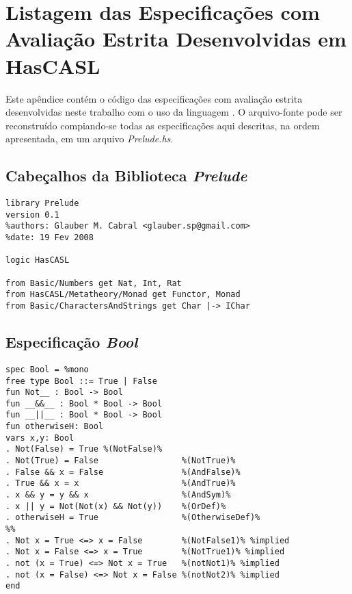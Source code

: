 \chapter{Listagem das Especificações com Avaliação Estrita Desenvolvidas em HasCASL}
\label{appendix:strictSpec}
Este apêndice contém o código das especificações com avaliação estrita desenvolvidas neste trabalho com o uso da linguagem \HasCASL.
O arquivo-fonte pode ser reconstruído compiando-se todas as especificações aqui descritas, na ordem apresentada, em um arquivo \textit{Prelude.hs}.

\section{Cabeçalhos da Biblioteca \textit{Prelude}}
\label{appendix:strictSpec:header}
\begin{Verbatim}
library Prelude
version 0.1
%authors: Glauber M. Cabral <glauber.sp@gmail.com>
%date: 19 Fev 2008

logic HasCASL 

from Basic/Numbers get Nat, Int, Rat
from HasCASL/Metatheory/Monad get Functor, Monad
from Basic/CharactersAndStrings get Char |-> IChar
\end{Verbatim}

\section{Especificação \textit{Bool}}
\label{appendix:strictSpec:bool}
\begin{Verbatim}
spec Bool = %mono
free type Bool ::= True | False 
fun Not__ : Bool -> Bool
fun __&&__ : Bool * Bool -> Bool
fun __||__ : Bool * Bool -> Bool
fun otherwiseH: Bool      
vars x,y: Bool
. Not(False) = True %(NotFalse)%
. Not(True) = False                 %(NotTrue)%
. False && x = False                %(AndFalse)%
. True && x = x                     %(AndTrue)%
. x && y = y && x                   %(AndSym)%
. x || y = Not(Not(x) && Not(y))    %(OrDef)%
. otherwiseH = True                 %(OtherwiseDef)%
%% 
. Not x = True <=> x = False        %(NotFalse1)% %implied
. Not x = False <=> x = True        %(NotTrue1)% %implied
. not (x = True) <=> Not x = True   %(notNot1)% %implied
. not (x = False) <=> Not x = False %(notNot2)% %implied
end
\end{Verbatim}

